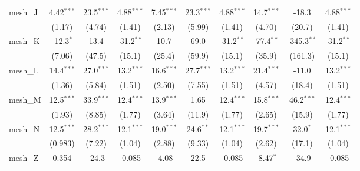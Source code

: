 \begin{tabular}{lccccccccc}
   mesh\_J                                                     & 4.42$^{***}$  & 23.5$^{***}$  & 4.88$^{***}$  & 7.45$^{***}$  & 23.3$^{***}$   & 4.88$^{***}$  & 14.7$^{***}$  & -18.3         & 4.88$^{***}$\\   
                                                               & (1.17)        & (4.74)        & (1.41)        & (2.13)        & (5.99)         & (1.41)        & (4.70)        & (20.7)        & (1.41)\\   
   mesh\_K                                                     & -12.3$^{*}$   & 13.4          & -31.2$^{**}$  & 10.7          & 69.0           & -31.2$^{**}$  & -77.4$^{**}$  & -345.3$^{**}$ & -31.2$^{**}$\\   
                                                               & (7.06)        & (47.5)        & (15.1)        & (25.4)        & (59.9)         & (15.1)        & (35.9)        & (161.3)       & (15.1)\\   
   mesh\_L                                                     & 14.4$^{***}$  & 27.0$^{***}$  & 13.2$^{***}$  & 16.6$^{***}$  & 27.7$^{***}$   & 13.2$^{***}$  & 21.4$^{***}$  & -11.0         & 13.2$^{***}$\\   
                                                               & (1.36)        & (5.84)        & (1.51)        & (2.50)        & (7.55)         & (1.51)        & (4.57)        & (18.4)        & (1.51)\\   
   mesh\_M                                                     & 12.5$^{***}$  & 33.9$^{***}$  & 12.4$^{***}$  & 13.9$^{***}$  & 1.65           & 12.4$^{***}$  & 15.8$^{***}$  & 46.2$^{***}$  & 12.4$^{***}$\\   
                                                               & (1.93)        & (8.85)        & (1.77)        & (3.64)        & (11.9)         & (1.77)        & (2.65)        & (15.9)        & (1.77)\\   
   mesh\_N                                                     & 12.5$^{***}$  & 28.2$^{***}$  & 12.1$^{***}$  & 19.0$^{***}$  & 24.6$^{**}$    & 12.1$^{***}$  & 19.7$^{***}$  & 32.0$^{*}$    & 12.1$^{***}$\\   
                                                               & (0.983)       & (7.22)        & (1.04)        & (2.88)        & (9.33)         & (1.04)        & (2.62)        & (17.1)        & (1.04)\\   
   mesh\_Z                                                     & 0.354         & -24.3         & -0.085        & -4.08         & 22.5           & -0.085        & -8.47$^{*}$   & -34.9         & -0.085\\   

\end{tabular}
